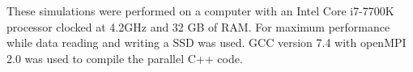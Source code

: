 \documentclass[preprint,10pt,authoryear]{elsarticle}
\begin{document}
\begin{linenumbers}

These simulations were performed 
on a computer with an Intel Core i7-7700K processor clocked at 4.2GHz and 
32 GB of RAM. For maximum performance while data reading and writing a SSD 
was used. GCC version 7.4 with openMPI 2.0 was used to compile 
the parallel C++ code.






\end{linenumbers}
\end{document}
